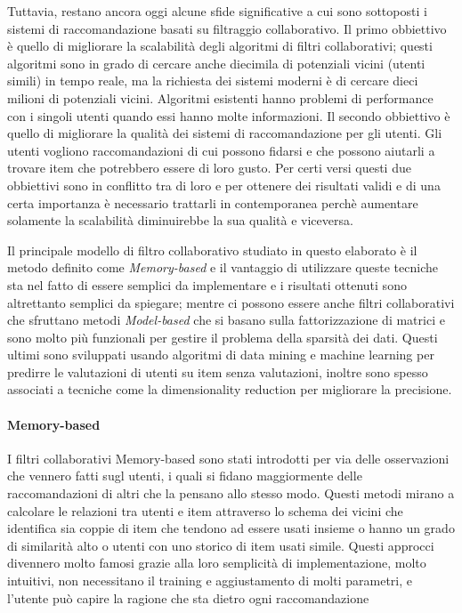 Tuttavia, restano ancora oggi alcune sfide significative a cui sono sottoposti i sistemi di raccomandazione basati su 
filtraggio collaborativo.
Il primo obbiettivo è quello di migliorare la scalabilità degli algoritmi di filtri collaborativi; questi algoritmi sono in grado di cercare
anche diecimila di potenziali vicini (utenti simili) in tempo reale, ma la richiesta dei sistemi moderni è di cercare dieci milioni di 
potenziali vicini. Algoritmi esistenti hanno problemi di performance con i singoli utenti quando essi hanno molte informazioni.
Il secondo obbiettivo è quello di migliorare la qualità dei sistemi di raccomandazione per gli utenti. Gli utenti vogliono
raccomandazioni di cui possono fidarsi e che possono aiutarli a trovare item che potrebbero essere di loro gusto.
Per certi versi questi due obbiettivi sono in conflitto tra di loro e per ottenere dei risultati validi e di una certa importanza è 
necessario trattarli in contemporanea perchè aumentare solamente la scalabilità diminuirebbe la sua qualità e viceversa. 
\cite{item-based-collaborative-filtering} 

Il principale modello di filtro collaborativo studiato in questo elaborato è il metodo definito come \textit{Memory-based} e il 
vantaggio di utilizzare queste tecniche sta nel fatto di essere semplici da implementare e i risultati ottenuti sono altrettanto 
semplici da spiegare; mentre ci possono essere anche filtri collaborativi che sfruttano metodi \textit{Model-based} che si basano sulla 
fattorizzazione di matrici e sono molto più funzionali per gestire il problema della sparsità dei dati. Questi ultimi sono sviluppati
usando algoritmi di data mining e machine learning per predirre le valutazioni di utenti su item senza valutazioni, inoltre sono spesso 
associati a tecniche come la dimensionality reduction per migliorare la precisione.






\paragraph{Memory-based} \hfill \break
I filtri collaborativi Memory-based sono stati introdotti per via delle osservazioni che vennero fatti sugl utenti, i quali si fidano
maggiormente delle raccomandazioni di altri che la pensano allo stesso modo. Questi metodi mirano a calcolare le relazioni tra utenti
e item attraverso lo schema dei vicini che identifica sia coppie di item che tendono ad essere usati insieme o hanno un grado di 
similarità alto o utenti con uno storico di item usati simile. \cite{taxonomy-of-recommender-agents-on-the-internet}
Questi approcci divennero molto famosi grazie alla loro semplicità di implementazione, molto intuitivi, non necessitano il training e
aggiustamento di molti parametri, e l'utente può capire la ragione che sta dietro ogni raccomandazione 

